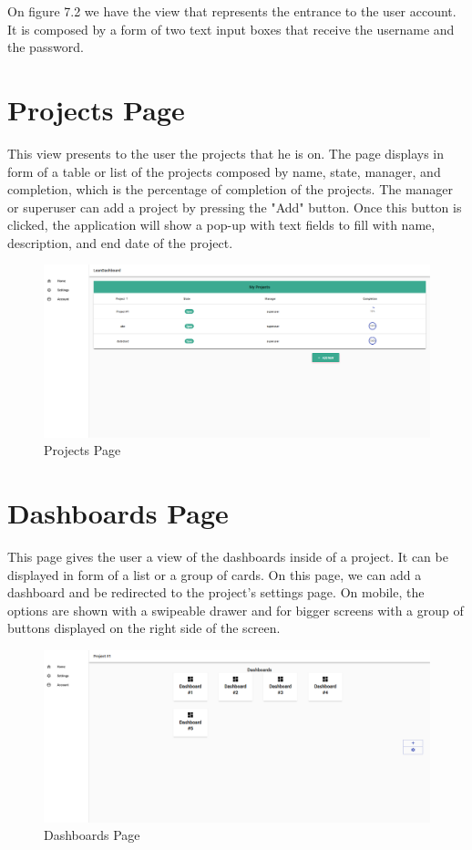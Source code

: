 \documentclass[a4paper,twoside,10pt]{report}
\begin{document}
\newpage 

On figure 7.2 we have the view that represents the entrance to the user account. It is composed by a form of two text input boxes that receive the username and the password.

\section{Projects Page}
This view presents to the user the projects that he is on. The page displays in form of a table or list of the projects composed by name, state, manager, and completion, which is the percentage of completion of the projects. The manager or superuser can add a project by pressing the "Add" button. Once this button is clicked, the application will show a pop-up with text fields to fill with name, description, and end date of the project.

\begin{figure}[h!]
\center
  \includegraphics[width=\textwidth]{projectsPage.png}
\caption{Projects Page}
\end{figure}

\section{Dashboards Page}
This page gives the user a view of the dashboards inside of a project. It can be displayed in form of a list or a group of cards. On this page, we can add a dashboard and be redirected to the project's settings page. On mobile, the options are shown with a swipeable drawer and for bigger screens with a group of buttons displayed on the right side of the screen.

\begin{figure}[h!]
\center
  \includegraphics[width=\textwidth]{dashboardsPage.png}
\caption{Dashboards Page}
\end{figure}
\end{document}

